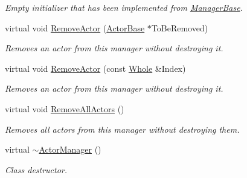 \begin{DoxyCompactItemize}
\begin{DoxyCompactList}\small\item\em Empty initializer that has been implemented from \hyperlink{classMezzanine_1_1ManagerBase}{ManagerBase}. \item\end{DoxyCompactList}\item 
virtual void \hyperlink{classMezzanine_1_1ActorManager_a5c28bea0eb64822ce94ce38762aedc1e}{RemoveActor} (\hyperlink{classMezzanine_1_1ActorBase}{ActorBase} $\ast$ToBeRemoved)
\begin{DoxyCompactList}\small\item\em Removes an actor from this manager without destroying it. \item\end{DoxyCompactList}\item 
virtual void \hyperlink{classMezzanine_1_1ActorManager_ac74758ad6d5c03b20105d641f0e37de3}{RemoveActor} (const \hyperlink{namespaceMezzanine_adcbb6ce6d1eb4379d109e51171e2e493}{Whole} \&Index)
\begin{DoxyCompactList}\small\item\em Removes an actor from this manager without destroying it. \item\end{DoxyCompactList}\item 
\hypertarget{classMezzanine_1_1ActorManager_a6ca8342617fa221b0548ff9bc6bf4477}{
virtual void \hyperlink{classMezzanine_1_1ActorManager_a6ca8342617fa221b0548ff9bc6bf4477}{RemoveAllActors} ()}
\label{classMezzanine_1_1ActorManager_a6ca8342617fa221b0548ff9bc6bf4477}

\begin{DoxyCompactList}\small\item\em Removes all actors from this manager without destroying them. \item\end{DoxyCompactList}\item 
\hypertarget{classMezzanine_1_1ActorManager_acb09f9f1b4766dd2ca9e645bb505ac2f}{
virtual \hyperlink{classMezzanine_1_1ActorManager_acb09f9f1b4766dd2ca9e645bb505ac2f}{$\sim$ActorManager} ()}
\label{classMezzanine_1_1ActorManager_acb09f9f1b4766dd2ca9e645bb505ac2f}

\begin{DoxyCompactList}\small\item\em Class destructor. \item\end{DoxyCompactList}\end{DoxyCompactItemize}
